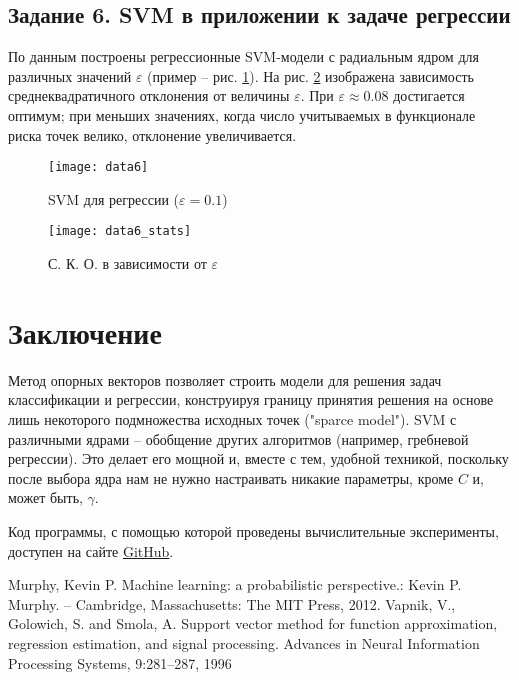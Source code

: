 \documentclass[a4paper,12pt]{article} %
\newcommand{\myPictWidth}{.95\textwidth}
\begin{document}
\subsection{Задание 6. SVM в приложении к задаче регрессии}

По данным построены регрессионные SVM-модели с радиальным ядром для различных значений $ \varepsilon $ (пример -- рис. \ref{fig:data6}). На рис. \ref{fig:data6_stats} изображена зависимость среднеквадратичного отклонения от величины $ \varepsilon $. При $ \varepsilon \approx 0.08 $ достигается оптимум; при меньших значениях, когда число учитываемых в функционале риска точек велико, отклонение увеличивается.

\begin{figure}[H]
    \centering \texttt{[image: data6]}
    \caption{SVM для регрессии ($ \varepsilon=0.1 $)}
    \label{fig:data6}
\end{figure}

\begin{figure}[H]
    \centering \texttt{[image: data6\_stats]}
    \caption{С. К. О. в зависимости от $ \varepsilon $}
    \label{fig:data6_stats}
\end{figure}

\newpage
\section{Заключение}

Метод опорных векторов позволяет строить модели для решения задач классификации и регрессии, конструируя границу принятия решения на основе лишь некоторого подмножества исходных точек ("sparce model").
SVM с различными ядрами -- обобщение других алгоритмов (например, гребневой регрессии).
Это делает его мощной и, вместе с тем, удобной техникой, поскольку после выбора ядра нам не нужно настраивать никакие параметры, кроме $ C $ и, может быть, $ \gamma $.

Код программы, с помощью которой проведены вычислительные эксперименты, доступен на сайте \href{https://github.com/zuevval/source/blob/master/r/ml/svm/svm.R}{GitHub}.

\begin{thebibliography}{99}
     Murphy, Kevin P. Machine learning: a probabilistic perspective.: Kevin P. Murphy. -- Cambridge, Massachusetts: The MIT Press, 2012.
     Vapnik, V., Golowich, S. and Smola, A. Support vector method for function approximation, regression estimation,
    and signal processing. Advances in Neural Information Processing Systems, 9:281–287, 1996
\end{thebibliography}
\end{document}
